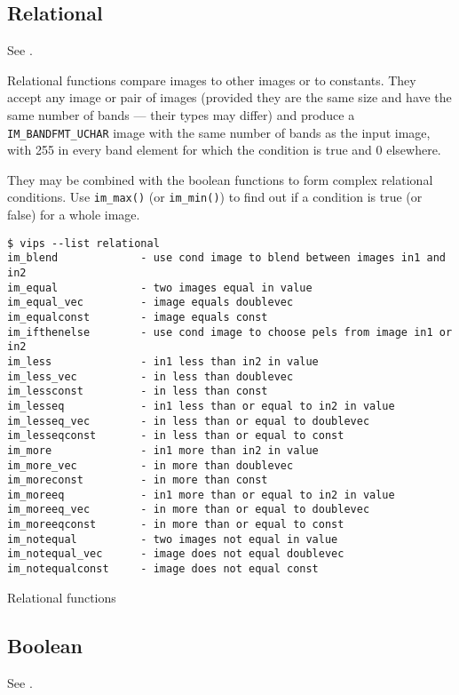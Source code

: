\subsection{Relational}

See .

Relational functions compare images to other images or to constants. They
accept any image or pair of images (provided they are the same size and
have the same number of bands --- their types may differ) and produce a
\verb+IM_BANDFMT_UCHAR+ image with the same number of bands as the input
image, with 255 in every band element for which the condition is true and
0 elsewhere.

They may be combined with the boolean functions to form complex relational
conditions. Use \verb+im_max()+ (or \verb+im_min()+) to find out if a
condition is true (or false) for a whole image.

\begin{fig2}
\begin{verbatim}
$ vips --list relational
im_blend             - use cond image to blend between images in1 and in2
im_equal             - two images equal in value
im_equal_vec         - image equals doublevec
im_equalconst        - image equals const
im_ifthenelse        - use cond image to choose pels from image in1 or in2
im_less              - in1 less than in2 in value
im_less_vec          - in less than doublevec
im_lessconst         - in less than const
im_lesseq            - in1 less than or equal to in2 in value
im_lesseq_vec        - in less than or equal to doublevec
im_lesseqconst       - in less than or equal to const
im_more              - in1 more than in2 in value
im_more_vec          - in more than doublevec
im_moreconst         - in more than const
im_moreeq            - in1 more than or equal to in2 in value
im_moreeq_vec        - in more than or equal to doublevec
im_moreeqconst       - in more than or equal to const
im_notequal          - two images not equal in value
im_notequal_vec      - image does not equal doublevec
im_notequalconst     - image does not equal const
\end{verbatim}
\caption{Relational functions}
\label{fg:relational}
\end{fig2}

\subsection{Boolean}

See .

